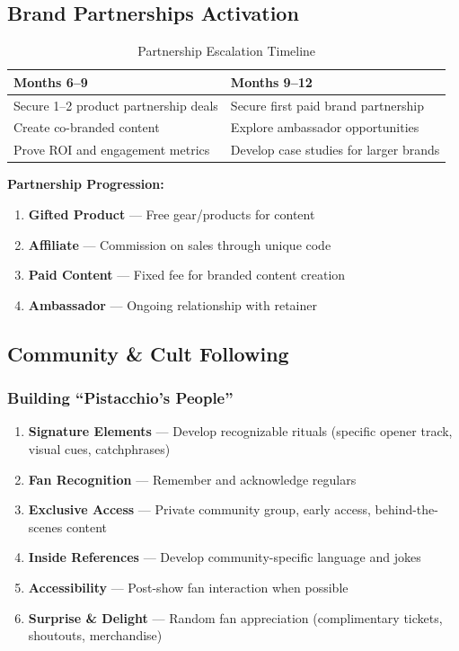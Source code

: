 \documentclass[11pt,a4paper]{article}
\begin{document}
\subsection{Brand Partnerships Activation}

\begin{table}[h!]
\centering
\renewcommand{\arraystretch}{1.3}
\begin{tabularx}{\textwidth}{X X}
\toprule
\rowcolor{amaraprimary}
\textcolor{amaracream}{\textbf{Months 6--9}} & \textcolor{amaracream}{\textbf{Months 9--12}} \\
\midrule
Secure 1--2 product partnership deals & Secure first paid brand partnership \\
Create co-branded content & Explore ambassador opportunities \\
Prove ROI and engagement metrics & Develop case studies for larger brands \\
\bottomrule
\end{tabularx}
\caption{Partnership Escalation Timeline}
\end{table}

\noindent\textbf{Partnership Progression:}
\begin{enumerate}[leftmargin=*]
    \item \textbf{Gifted Product} --- Free gear/products for content
    \item \textbf{Affiliate} --- Commission on sales through unique code
    \item \textbf{Paid Content} --- Fixed fee for branded content creation
    \item \textbf{Ambassador} --- Ongoing relationship with retainer
\end{enumerate}

\subsection{Community \& Cult Following}

\subsubsection{Building ``Pistacchio's People''}

\begin{enumerate}[leftmargin=*]
    \item \textbf{Signature Elements} --- Develop recognizable rituals (specific opener track, visual cues, catchphrases)
    \item \textbf{Fan Recognition} --- Remember and acknowledge regulars
    \item \textbf{Exclusive Access} --- Private community group, early access, behind-the-scenes content
    \item \textbf{Inside References} --- Develop community-specific language and jokes
    \item \textbf{Accessibility} --- Post-show fan interaction when possible
    \item \textbf{Surprise \& Delight} --- Random fan appreciation (complimentary tickets, shoutouts, merchandise)
\end{enumerate}
\end{document}
